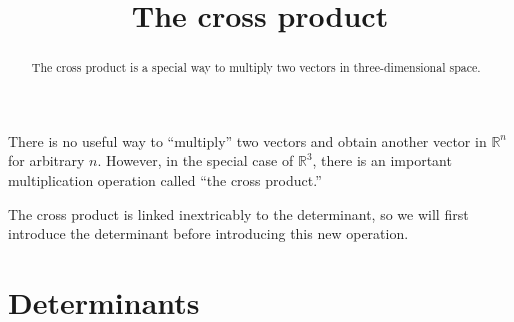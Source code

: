 \documentclass{ximera}
\title[Dig-In:]{The cross product}
\begin{document}
\begin{abstract}
  The cross product is a special way to multiply two vectors in
  three-dimensional space.
\end{abstract}
\maketitle

There is no useful way to ``multiply'' two vectors and obtain another
vector in $\mathbb{R}^n$ for arbitrary $n$. However, in the special case of
$\mathbb{R}^3$, there is an important multiplication operation called ``the
cross product.''

The cross product is linked inextricably to the determinant, so we
will first introduce the determinant before introducing this new
operation. 

\section{Determinants}
\end{document}
